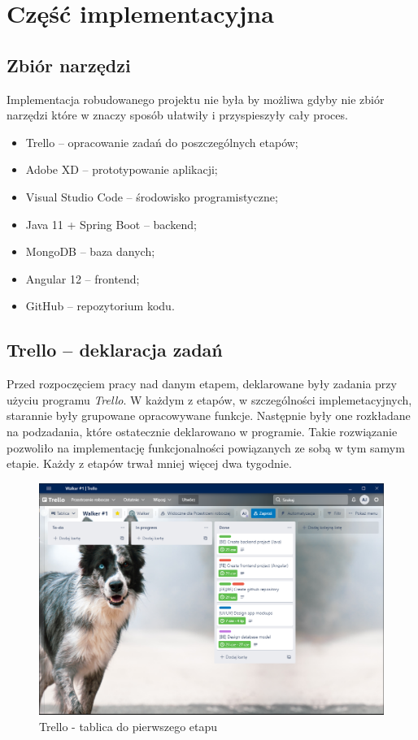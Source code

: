 \chapter{Część implementacyjna}

\section{Zbiór narzędzi}
Implementacja robudowanego projektu nie była by możliwa gdyby nie zbiór narzędzi które w znaczy sposób ułatwiły i przyspieszyły cały proces. 
\begin{itemize}[leftmargin=1cm]
    \item Trello -- opracowanie zadań do poszczególnych etapów;
    \item Adobe XD -- prototypowanie aplikacji;
    \item Visual Studio Code -- środowisko programistyczne;
    \item Java 11 + Spring Boot -- backend;
    \item MongoDB -- baza danych;
    \item Angular 12 -- frontend;
    \item GitHub -- repozytorium kodu.
\end{itemize}

\section{Trello -- deklaracja zadań}
Przed rozpoczęciem pracy nad danym etapem, deklarowane były zadania przy użyciu programu \textit{Trello}. W każdym z etapów, w szczególności implemetacyjnych, starannie były grupowane opracowywane funkcje. Następnie były one rozkładane na podzadania, które ostatecznie deklarowano w programie. Takie rozwiązanie pozwoliło na implementację funkcjonalności powiązanych ze sobą w tym samym etapie. Każdy z etapów trwał mniej więcej dwa tygodnie.
\begin{figure}[H]
    \centering
    \includegraphics[width=1\linewidth]{rysunki/w1.PNG}
    \caption{Trello - tablica do pierwszego etapu}
    \label{fig:walker-board-1}
\end{figure}    


